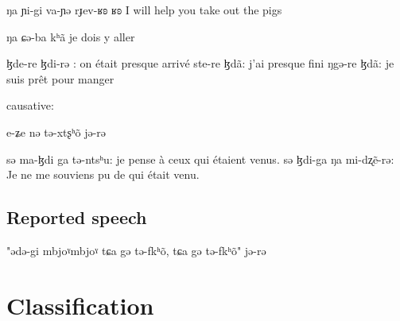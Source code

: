 \documentclass[oneside,a4paper,11pt]{article}
\begin{document}
  ŋa ɲi-gi va-ɲə rɟev-ʁʚ ʁʚ
  I will help you take out the pigs


 ŋa ɕə-ba kʰã
 je dois y aller
 
 		ɮde-re ɮdi-rə : on était presque arrivé 
		ste-re ɮdã: j'ai presque fini
		ŋgə-re ɮdã: je suis prêt pour manger
		
causative:

e-ʑe nə tə-xtʂʰõ jə-rə


		sə ma-ɮdi ga tə-ntsʰu: je pense à ceux qui étaient venus.
		sə ɮdi-ga ŋa mi-dʐẽ-rə: Je ne me souviens pu de qui était venu.
\subsection{Reported speech} 
		"ədə-gi mbjoˠmbjoˠ tɕa gə tə-fkʰõ, tɕa gə tə-fkʰõ" jə-rə
		
\section{Classification} \label{sec:classification}
 
 
  \citet{lai14person}



\end{document}
